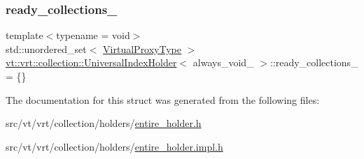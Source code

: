 \mbox{\label{structvt_1_1vrt_1_1collection_1_1_universal_index_holder_a68ef587e677d634684e27732e9cbf8e8}} 
\subsubsection{\texorpdfstring{ready\+\_\+collections\+\_\+}{ready\_collections\_}}
{\footnotesize\ttfamily template$<$typename  = void$>$ \\
std\+::unordered\+\_\+set$<$ \hyperlink{namespacevt_a1b417dd5d684f045bb58a0ede70045ac}{Virtual\+Proxy\+Type} $>$ \hyperlink{structvt_1_1vrt_1_1collection_1_1_universal_index_holder}{vt\+::vrt\+::collection\+::\+Universal\+Index\+Holder}$<$ always\+\_\+void\+\_\+ $>$\+::ready\+\_\+collections\+\_\+ = \{\}\hspace{0.3cm}{\ttfamily [static]}}



The documentation for this struct was generated from the following files\+:\begin{DoxyCompactItemize}
\item 
src/vt/vrt/collection/holders/\hyperlink{entire__holder_8h}{entire\+\_\+holder.\+h}\item 
src/vt/vrt/collection/holders/\hyperlink{entire__holder_8impl_8h}{entire\+\_\+holder.\+impl.\+h}\end{DoxyCompactItemize}
